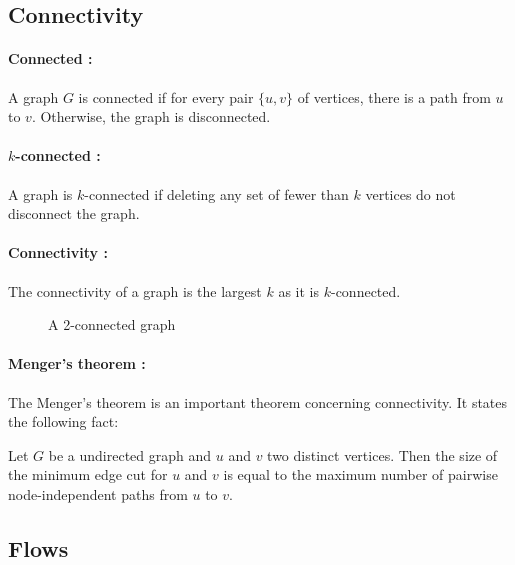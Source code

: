 \subsection{Connectivity}
\paragraph{Connected :}\label{defConnectivity}
A graph $G$ is connected if for every pair $\{u,v\}$ of vertices, there is a 
path from $u$ to $v$. Otherwise, the graph is disconnected.

\paragraph{$k$-connected :}
A graph is $k$-connected if deleting any set of fewer than $k$ vertices do not 
disconnect the graph.

\paragraph{Connectivity :}
The connectivity of a graph is the largest $k$ as it is $k$-connected. 

\begin{figure}[!h]
  \begin{center}
    
  \end{center}
  \caption{A 2-connected graph}
\end{figure}

\paragraph{Menger's theorem :}
The Menger's theorem is an important theorem concerning connectivity.
It states the following fact:

Let $G$ be a undirected graph and $u$ and $v$ two distinct vertices.
Then the size of the minimum edge cut for $u$ and $v$ is equal to the maximum
number of pairwise node-independent paths from $u$ to $v$.



\subsection{Flows}
